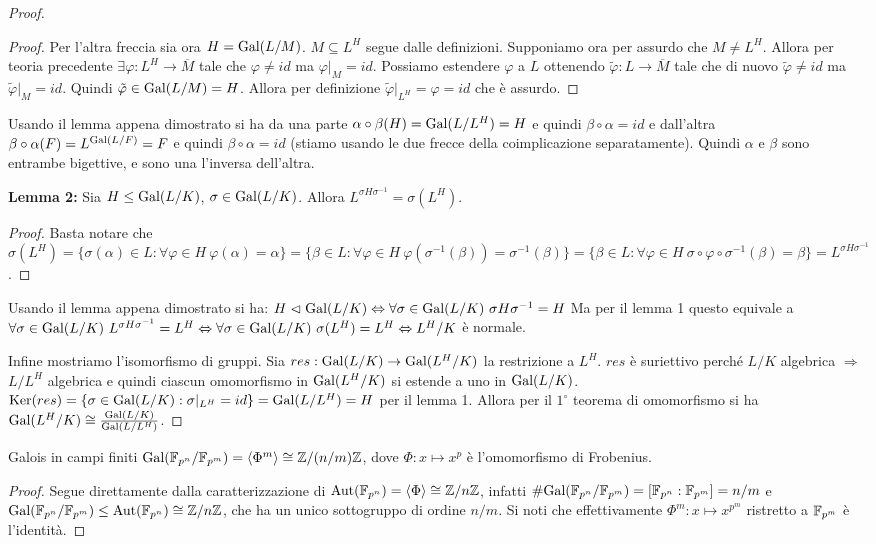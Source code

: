 \begin{proof}
\begin{proof}
        Per l'altra freccia sia ora $H = \text{Gal}(L/M)$. $M \subseteq L^H$ segue dalle definizioni. Supponiamo ora per assurdo che $M \neq L^H$. Allora per teoria precedente $\exists \varphi : L^H \rightarrow \overline{M}$ tale che $\varphi \neq id$ ma $\varphi|_M = id$. Possiamo estendere $\varphi$ a $L$ ottenendo $\tilde \varphi : L \rightarrow \overline{M}$ tale che di nuovo $\tilde \varphi \neq id$ ma $\tilde \varphi|_M = id$. Quindi $\tilde \varphi \in \text{Gal}(L/M) = H$. Allora per definizione $\tilde \varphi|_{L^H} = \varphi  = id$ che è assurdo. 
    \end{proof}
    Usando il lemma appena dimostrato si ha da una parte $\alpha \circ \beta (H) = \text{Gal}(L/L^H) = H$ e quindi $\beta \circ \alpha = id$ e dall'altra $\beta \circ \alpha (F) = L^{\text{Gal}(L/F)} = F$ e quindi $\beta \circ \alpha = id$  (stiamo usando le due frecce della coimplicazione separatamente). Quindi $\alpha$ e $\beta$ sono entrambe bigettive, e sono una l'inversa dell'altra.
    
    \textbf{Lemma 2:} Sia $H \leq \text{Gal}(L/K)$, $\sigma \in \text{Gal}(L/K)$. Allora $L^{\sigma H \sigma^{-1}}=\sigma(L^H)$.
    \begin{proof}
         Basta notare che $\sigma(L^H) = \{ \sigma(\alpha) \in L : \forall \varphi \in H \ \varphi(\alpha) = \alpha\} =  \{ \beta \in L : \forall \varphi \in H \ \varphi(\sigma^{-1}(\beta)) = \sigma^{-1}(\beta)\} = \{ \beta \in L : \forall \varphi \in H \ \sigma \circ \varphi \circ \sigma^{-1}(\beta) = \beta \} = L^{\sigma H \sigma^{-1}}$.
    \end{proof}
    Usando il lemma appena dimostrato si ha: $H \vartriangleleft \text{Gal}(L/K) \Leftrightarrow \forall \sigma \in \text{Gal}(L/K) \ \sigma H \sigma^{-1} = H$ Ma per il lemma 1 questo equivale a $ \forall \sigma \in \text{Gal}(L/K) \ L^{\sigma H \sigma^{-1}}=L^H \Leftrightarrow  \forall \sigma \in \text{Gal}(L/K) \ \sigma(L^H)=L^H \Leftrightarrow L^H/K$ è normale.
    
    Infine mostriamo l'isomorfismo di gruppi. Sia $res : \text{Gal}(L/K) \rightarrow \text{Gal}(L^H/K)$ la restrizione a $L^H$. $res$ è suriettivo perché $L/K$ algebrica $\Rightarrow$ $L/L^H$ algebrica e quindi ciascun omomorfismo in $\text{Gal}(L^H/K)$ si estende a uno in $\text{Gal}(L/K)$. \\ $\text{Ker}(res) = \{ \sigma \in \text{Gal}(L/K) : \sigma|_{L^H} = id\} = \text{Gal}(L/L^H) = H$ per il lemma 1. Allora per il $1^{\circ}$ teorema di omomorfismo si ha $\text{Gal}(L^H/K) \cong \frac{\text{Gal}(L/K)}{\text{Gal}(L/L^H)}$.
\end{proof}

\begin{theorem}{Galois in campi finiti}
    $\text{Gal}(\mathbb{F}_{p^n} / \mathbb{F}_{p^m}) = \langle \Phi^m \rangle \cong \mathbb{Z}/(n/m)\mathbb{Z}$, dove $\Phi : x \mapsto x^p$ è l'omomorfismo di Frobenius.
\end{theorem}
\begin{proof}
    Segue direttamente dalla caratterizzazione di $\text{Aut}(\mathbb{F}_{p^n}) = \langle \Phi \rangle \cong \mathbb{Z}/n\mathbb{Z}$, infatti $\#\text{Gal}(\mathbb{F}_{p^n} / \mathbb{F}_{p^m}) = [\mathbb{F}_{p^n} : \mathbb{F}_{p^m}] = n / m$ e $\text{Gal}(\mathbb{F}_{p^n} / \mathbb{F}_{p^m}) \le \text{Aut}(\mathbb{F}_{p^n}) \cong \mathbb{Z}/n\mathbb{Z}$, che ha un unico sottogruppo di ordine $n / m$. Si noti che effettivamente $\Phi^m : x \mapsto x^{p^m}$ ristretto a $\mathbb{F}_{p^m}$ è l'identità.
\end{proof}

